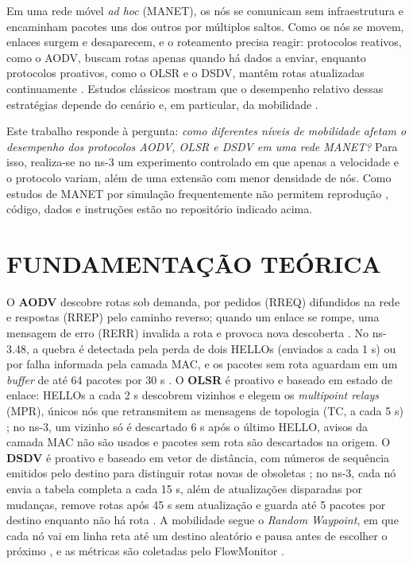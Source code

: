 \documentclass[12pt]{article}
\begin{document}
Em uma rede móvel \textit{ad hoc} (MANET), os nós se comunicam sem infraestrutura e encaminham pacotes uns dos outros por múltiplos saltos. Como os nós se movem, enlaces surgem e desaparecem, e o roteamento precisa reagir: protocolos reativos, como o AODV, buscam rotas apenas quando há dados a enviar, enquanto protocolos proativos, como o OLSR e o DSDV, mantêm rotas atualizadas continuamente \cite{rfc3561,rfc3626,perkins1994}. Estudos clássicos mostram que o desempenho relativo dessas estratégias depende do cenário e, em particular, da mobilidade \cite{broch1998,das2000}.

Este trabalho responde à pergunta: \textit{como diferentes níveis de mobilidade afetam o desempenho dos protocolos AODV, OLSR e DSDV em uma rede MANET?} Para isso, realiza-se no ns-3 um experimento controlado em que apenas a velocidade e o protocolo variam, além de uma extensão com menor densidade de nós. Como estudos de MANET por simulação frequentemente não permitem reprodução \cite{kurkowski2005}, código, dados e instruções estão no repositório indicado acima.

\section{FUNDAMENTAÇÃO TEÓRICA}

O \textbf{AODV} descobre rotas sob demanda, por pedidos (RREQ) difundidos na rede e respostas (RREP) pelo caminho reverso; quando um enlace se rompe, uma mensagem de erro (RERR) invalida a rota e provoca nova descoberta \cite{rfc3561}. No ns-3.48, a quebra é detectada pela perda de dois HELLOs (enviados a cada 1 s) ou por falha informada pela camada MAC, e os pacotes sem rota aguardam em um \textit{buffer} de até 64 pacotes por 30 s \cite{ns3modelos}. O \textbf{OLSR} é proativo e baseado em estado de enlace: HELLOs a cada 2 s descobrem vizinhos e elegem os \textit{multipoint relays} (MPR), únicos nós que retransmitem as mensagens de topologia (TC, a cada 5 s) \cite{rfc3626}; no ns-3, um vizinho só é descartado 6 s após o último HELLO, avisos da camada MAC não são usados e pacotes sem rota são descartados na origem. O \textbf{DSDV} é proativo e baseado em vetor de distância, com números de sequência emitidos pelo destino para distinguir rotas novas de obsoletas \cite{perkins1994}; no ns-3, cada nó envia a tabela completa a cada 15 s, além de atualizações disparadas por mudanças, remove rotas após 45 s sem atualização e guarda até 5 pacotes por destino enquanto não há rota \cite{ns3modelos}. A mobilidade segue o \textit{Random Waypoint}, em que cada nó vai em linha reta até um destino aleatório e pausa antes de escolher o próximo \cite{camp2002}, e as métricas são coletadas pelo FlowMonitor \cite{carneiro2009}.
\end{document}
